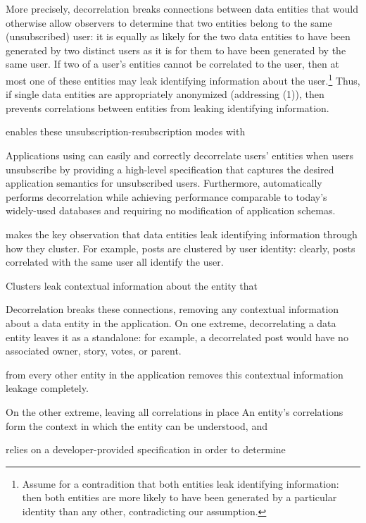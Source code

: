 More precisely, decorrelation breaks connections between data
entities that would otherwise allow observers to determine that two entities belong to the same
(unsubscribed) user: it is equally as likely for the two data entities to have been generated by two
distinct users as it is for them to have been generated by the same user.  If two of a user's
entities cannot be correlated to the user, then at most one of these entities may leak identifying
information about the user.\footnote{Assume for a contradition that both entities leak identifying
information: then both entities are more likely to have been generated by a particular identity than
any other, contradicting our assumption.}  Thus, if single data entities are appropriately
anonymized (addressing (1)), then \sys{} prevents correlations between entities from leaking
identifying information.

enables these unsubscription-resubscription modes with 

Applications using \sys{} can easily and correctly decorrelate users'
entities when users unsubscribe by providing a high-level specification that captures the
desired application semantics for unsubscribed users. Furthermore, \sys{} automatically performs
decorrelation while achieving performance comparable to today’s widely-used databases and requiring
no modification of application schemas. 


\sys{} makes the key observation that data entities leak identifying
information through how they cluster. For example, posts are clustered by user identity: clearly,
posts correlated with the same user all identify the user. 



Clusters leak contextual information about the entity that 

Decorrelation breaks these connections, removing any contextual information about a data entity in
the application. On one extreme, decorrelating a data entity leaves it as a standalone: for example,
a decorrelated post would have no associated owner, story, votes, or parent. 


from every other entity in the
application removes this contextual information leakage completely.

On the other extreme, leaving all correlations in place
An entity's correlations form the context in which the entity
can be understood, and 



\sys{} relies on a developer-provided specification in order to determine 


